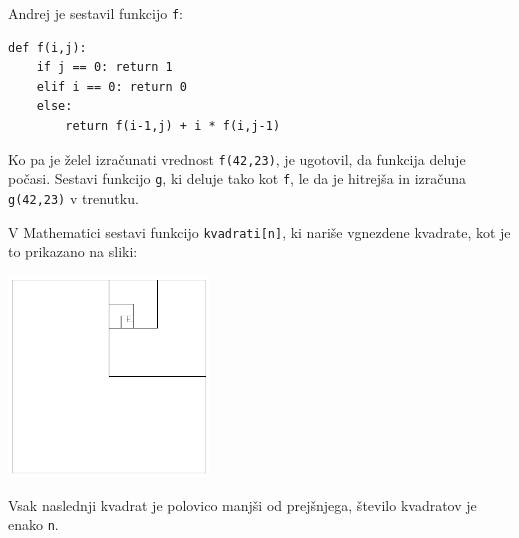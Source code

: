 \documentclass[arhiv]{izpit}
\begin{document}
\goodbreak

\naloga[\tocke{25}]

Andrej je sestavil funkcijo \texttt{f}:
%
\begin{verbatim}
def f(i,j):
    if j == 0: return 1
    elif i == 0: return 0
    else:
        return f(i-1,j) + i * f(i,j-1)
\end{verbatim}
%
Ko pa je želel izračunati vrednost \texttt{f(42,23)}, je ugotovil, da
funkcija deluje počasi.
%
Sestavi funkcijo \texttt{g}, ki deluje tako kot \texttt{f}, le da je
hitrejša in izračuna \texttt{g(42,23)} v trenutku.

\naloga[\tocke{25}]

V Mathematici sestavi funkcijo \texttt{kvadrati[n]}, ki nariše
vgnezdene kvadrate, kot je to prikazano na sliki:
%
\begin{center}
  \includegraphics[width=0.4\textwidth]{kvadrati}
\end{center}
%
Vsak naslednji kvadrat je polovico manjši od prejšnjega, število
kvadratov je enako \texttt{n}.
\end{document}
